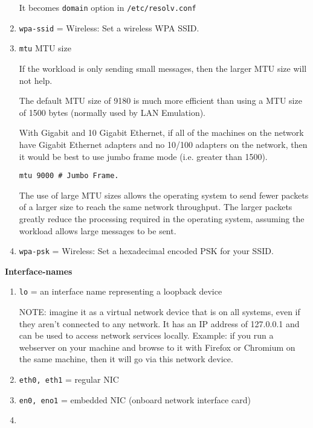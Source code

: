 \begin{enumerate}
  It becomes \verb!domain! option in \verb!/etc/resolv.conf!
  
  \item \verb!wpa-ssid! = Wireless: Set a wireless WPA SSID.
  
  \item \verb!mtu! MTU size
  
If the workload is only sending small messages, then the larger MTU size will
not help.

The default MTU size of 9180 is much more efficient than using a MTU size of
1500 bytes (normally used by LAN Emulation).

 With Gigabit and 10 Gigabit Ethernet, if all of the machines on the network
have Gigabit Ethernet adapters and no 10/100 adapters on the network, then it
would be best to use jumbo frame mode (i.e. greater than 1500).
\begin{verbatim}
mtu 9000 # Jumbo Frame.
\end{verbatim}

The use of large MTU sizes allows the operating system to send fewer packets of
a larger size to reach the same network throughput. The larger packets greatly
reduce the processing required in the operating system, assuming the workload
allows large messages to be sent. 



   \item \verb!wpa-psk! = Wireless: Set a hexadecimal encoded PSK for your SSID.
   
   
\end{enumerate}

{\bf Interface-names}
\begin{enumerate}
  \item \verb!lo! = an interface name representing a loopback device
  
  NOTE:  imagine it as a virtual network device that is on all systems, even if
  they aren't connected to any network. It has an IP address of 127.0.0.1 and
  can be used to access network services locally.  
  Example: if you run a webserver on your machine and browse to it with Firefox
  or Chromium on the same machine, then it will go via this network device.

  
  \item \verb!eth0, eth1! = regular NIC
  
  \item \verb!en0, eno1! = embedded NIC (onboard network interface card)
  
  \item 
\end{enumerate}

